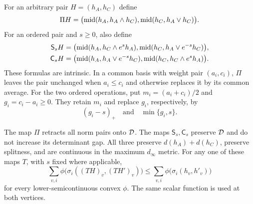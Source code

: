 For an arbitrary pair $H=(h_A,h_C)$ define
\begin{equation}\label{eq:orderretraction}
 \Pi H=\bigl(\operatorname{mid}(h_A,h_A\wedge h_C),
             \operatorname{mid}(h_C,h_A\vee h_C)\bigr).
\end{equation}
For an ordered pair and $s\ge0$, also define
\begin{equation}\label{eq:shrinkandcap}
 \begin{aligned}
 \mathsf S_sH&=\bigl(\operatorname{mid}(h_A,h_C\wedge e^s h_A),
                    \operatorname{mid}(h_C,h_A\vee e^{-s}h_C)\bigr),\\
 \mathsf C_sH&=\bigl(\operatorname{mid}(h_A,h_A\vee e^{-s}h_C),
                    \operatorname{mid}(h_C,h_C\wedge e^s h_A)\bigr).
 \end{aligned}
\end{equation}
These formulas are intrinsic. In a common basis with weight pair
$(a_i,c_i)$, $\Pi$ leaves the pair unchanged when $a_i\le c_i$
and otherwise replaces it by its common average. For the two ordered
operations, put $m_i=(a_i+c_i)/2$ and $g_i=c_i-a_i\ge0$.
They retain $m_i$ and replace $g_i$, respectively, by
\begin{equation}\label{eq:gapoperations}
 (g_i-s)_+\quad\text{and}\quad\min\{g_i,s\}.
\end{equation}

\begin{lemma}\label{lem:pairretractions}
The map $\Pi$ retracts all norm pairs onto $\mathcal D$. The maps
$\mathsf S_s,\mathsf C_s$ preserve $\mathcal D$ and do not increase its
determinant gap. All three preserve $d(h_A)+d(h_C)$, preserve
splitness, and are continuous in the maximum $d_\infty$ metric.
For any one of these maps $T$, with $s$ fixed where applicable,
\begin{equation}\label{eq:totalcostcontraction}
 \sum_{v,i}\phi\bigl(\sigma_i((TH)_v,(TH')_v)\bigr)
 \le\sum_{v,i}\phi\bigl(\sigma_i(h_v,h'_v)\bigr)
\end{equation}
for every lower-semicontinuous convex $\phi$. The same scalar function
is used at both vertices.
\end{lemma}

